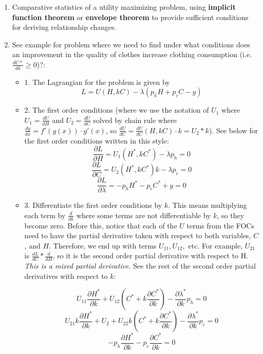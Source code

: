 \documentclass{article}
\begin{document}
\begin{enumerate}
    \item Comparative statistics of a utility maximizing problem, using \textbf{implicit function theorem} or \textbf{envelope theorem} to provide sufficient conditions for deriving relationship changes.
    \item See example for problem where we need to find under what conditions does an improvement in the quality of clothes increase clothing consumption (i.e. $\frac{dC*}{dk} \geq 0$)?:
        \begin{itemize}         
            \item{1. The Lagrangian for the problem is given by}   
            \[
            L = U(H, kC) - \lambda (p_h H + p_c C - y)
            \]            
            \item{2. The first order conditions (where we use the notation of $U_{1}$ where $U_{1} = \frac{dU}{dH}$ and $U_{2} = \frac{dU}{dC}$ solved by chain rule where $\frac{dy}{dx} = f'(g(x)) \cdot g'(x)$, so $\frac{dU}{dC} = \frac{dU}{dC}(H, kC) \cdot k = U_{2}*k$}). See below for the first order conditions written in this style:
            \[
            \frac{\partial L}{\partial H} = U_1(H^*, kC^*) - \lambda p_h = 0
            \]
            \[
            \frac{\partial L}{\partial C} = U_2(H^*, kC^*) k - \lambda p_c = 0
            \]
            \[
            \frac{\partial L}{\partial \lambda} = -p_h H^* - p_c C^* + y = 0
            \]
            
            \item{3. Differentiate the first order conditions by \( k \). This means multiplying each term by $\frac{d}{dk}$ where some terms are not differentiable by $k$, so they become zero. Before this, notice that each of the $U$ terms from the FOCs need to have the partial derivative taken with respect to both variables, $C$, and $H$. Therefore, we end up with terms $U_{11}, U_{12},$ etc. For example, $U_{21}$ is $\frac{dL}{dC}*\frac{d}{dH}$, so it is the second order partial derivative with respect to H. \textit{This is a mixed partial derivative}. See the rest of the second order partial derivatives with respect to $k$:}
            
            \[
            U_{11} \frac{\partial H^*}{\partial k} + U_{12} \left( C^* + k \frac{\partial C^*}{\partial k} \right) - \frac{\partial \lambda^*}{\partial k} p_h = 0
            \]
            \[
            U_{21} k \frac{\partial H^*}{\partial k} + U_2 + U_{22} k \left( C^* + k \frac{\partial C^*}{\partial k} \right) - \frac{\partial \lambda^*}{\partial k} p_c = 0
            \]
            \[
            -p_h \frac{\partial H^*}{\partial k} - p_c \frac{\partial C^*}{\partial k} = 0
            \]
            

\end{itemize}
\end{enumerate}
\end{document}
